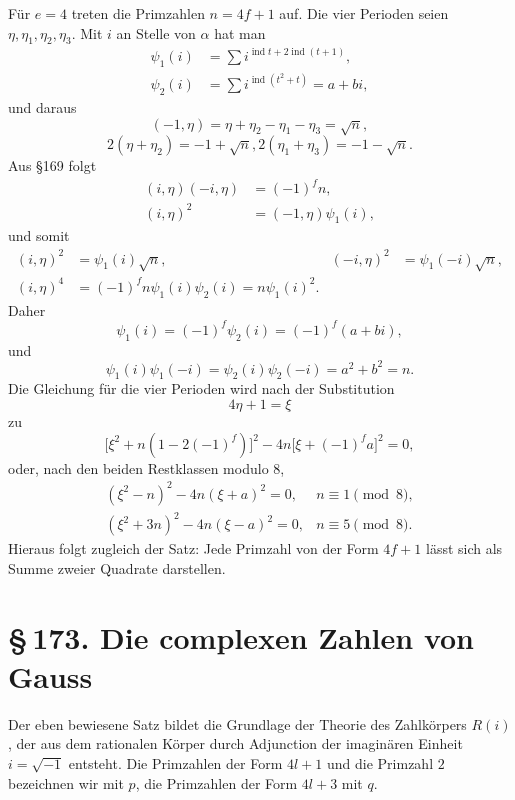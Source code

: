 \documentclass[11pt]{article}
\providecommand{\sect}[2]{\section*{\S\,#1. #2}}
\providecommand{\ind}{\operatorname{ind}}
\begin{document}
Für $e=4$ treten die Primzahlen $n=4f+1$ auf. Die vier Perioden seien $\eta,
\eta_1,
\eta_2,
\eta_3$. Mit $i$ an Stelle von $\alpha$ hat man
\[
\begin{aligned}
\psi_1(i)&=\sum i^{\ind t+2\ind(t+1)},\\
\psi_2(i)&=\sum i^{\ind(t^2+t)}=a+bi,
\end{aligned}                                                          \tag{24}
\]
und daraus
\[
        (-1,
\eta)=\eta+
\eta_2-
\eta_1-
\eta_3=\sqrt n,                                      \tag{25}
\]
\[
        2(\eta+
\eta_2)=-1+\sqrt n,
        2(\eta_1+
\eta_3)=-1-
\sqrt n.                           \tag{26}
\]
Aus §169 folgt
\[
\begin{aligned}
        (i,
\eta)(-i,
\eta)&=(-1)^f n,\\
        (i,
\eta)^2&=(-1,
\eta)\psi_1(i),
\end{aligned}                                                          \tag{27}
\]
und somit
\[
\begin{aligned}
        (i,
\eta)^2&=\psi_1(i)\sqrt n,
        &(-i,
\eta)^2&=\psi_1(-i)\sqrt n,\\
        (i,
\eta)^4&=(-1)^f n\psi_1(i)\psi_2(i)=n\psi_1(i)^2.
\end{aligned}                                                          \tag{28}
\]
Daher
\[
        \psi_1(i)=(-1)^f\psi_2(i)=(-1)^f(a+bi),                        \tag{29}
\]
und
\[
        \psi_1(i)\psi_1(-i)=\psi_2(i)\psi_2(-i)=a^2+b^2=n.              \tag{30}
\]
Die Gleichung für die vier Perioden wird nach der Substitution
\[
        4\eta+1=\xi
\]
zu
\[
        \bigl[\xi^2+n(1-2(-1)^f)\bigr]^2
        -4n\bigl[\xi+(-1)^fa\bigr]^2=0,                                \tag{31}
\]
oder, nach den beiden Restklassen modulo $8$,
\[
\begin{array}{ll}
        (\xi^2-n)^2-4n(\xi+a)^2=0,
        & n\equiv1\pmod8,\\[0.4em]
        (\xi^2+3n)^2-4n(\xi-a)^2=0,
        & n\equiv5\pmod8.
\end{array}                                                            \tag{32}
\]
Hieraus folgt zugleich der Satz: Jede Primzahl von der Form $4f+1$ lässt sich als Summe zweier Quadrate darstellen.

\sect{173}{Die complexen Zahlen von Gauss}

Der eben bewiesene Satz bildet die Grundlage der Theorie des Zahlkörpers $R(i)$, der aus dem rationalen Körper durch Adjunction der imaginären Einheit $i=\sqrt{-1}$ entsteht. Die Primzahlen der Form $4l+1$ und die Primzahl $2$ bezeichnen wir mit $p$, die Primzahlen der Form $4l+3$ mit $q$.
\end{document}
